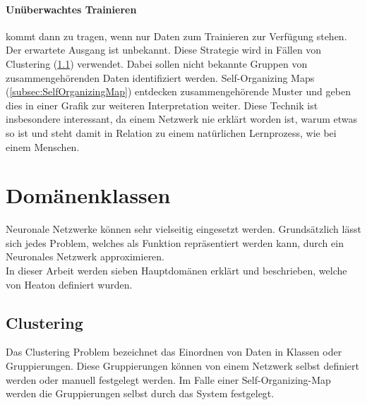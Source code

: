 \paragraph{Unüberwachtes Trainieren} kommt dann zu tragen, wenn nur Daten zum Trainieren zur Verfügung stehen.
Der erwartete Ausgang ist unbekannt.
Diese Strategie wird in Fällen von Clustering (\ref{subsec:Clustering}) verwendet.
Dabei sollen nicht bekannte Gruppen von zusammengehörenden Daten identifiziert werden. 
Self-Organizing Maps (\ref{subsec:SelfOrganizingMap}) entdecken zusammengehörende Muster und geben dies in einer Grafik zur weiteren Interpretation weiter. 
Diese Technik ist insbesondere interessant, da einem Netzwerk nie erklärt worden ist, warum etwas so ist und steht damit in Relation zu einem natürlichen Lernprozess, wie bei einem Menschen.

\section{Domänenklassen}
\label{sec:Domänenklassen}

Neuronale Netzwerke können sehr vielseitig eingesetzt werden. 
Grundsätzlich lässt sich jedes Problem, welches als Funktion repräsentiert werden kann, durch ein Neuronales Netzwerk approximieren. \\

\noindent
In dieser Arbeit werden sieben Hauptdomänen erklärt und beschrieben, welche von Heaton \cite{AI3} definiert wurden. %

\subsection{Clustering}
\label{subsec:Clustering}

Das Clustering Problem bezeichnet das Einordnen von Daten in Klassen oder Gruppierungen. 
Diese Gruppierungen können von einem Netzwerk selbst definiert werden oder manuell festgelegt werden. 
Im Falle einer Self-Organizing-Map werden die Gruppierungen selbst durch das System festgelegt.

